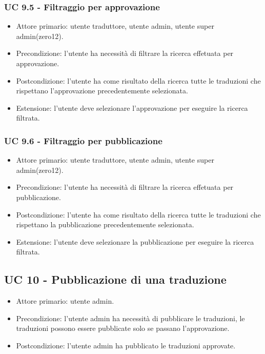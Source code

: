     \subsubsection{UC 9.5 - Filtraggio per approvazione}
        \begin{itemize}
            \item Attore primario: utente traduttore, utente admin, utente super admin(zero12).
            \item Precondizione: l'utente ha necessità di filtrare la ricerca effetuata per approvazione.
            \item Postcondizione: l'utente ha come risultato della ricerca tutte le traduzioni che rispettano l'approvazione precedentemente selezionata. 
            \item Estensione: l'utente deve selezionare l'approvazione per eseguire la ricerca filtrata.
        \end{itemize}  
    \subsubsection{UC 9.6 - Filtraggio per pubblicazione}
        \begin{itemize}
            \item Attore primario: utente traduttore, utente admin, utente super admin(zero12).
            \item Precondizione: l'utente ha necessità di filtrare la ricerca effetuata per pubblicazione.
            \item Postcondizione: l'utente ha come risultato della ricerca tutte le traduzioni che rispettano la pubblicazione precedentemente selezionata. 
            \item Estensione: l'utente deve selezionare la pubblicazione per eseguire la ricerca filtrata.
        \end{itemize} 
\subsection{UC 10 - Pubblicazione di una traduzione}
        \begin{itemize}
            \item Attore primario: utente admin.
            \item Precondizione: l'utente admin ha necessità di pubblicare le traduzioni, le traduzioni possono essere pubblicate solo se passano l'approvazione. 
            \item Postcondizione: l'utente admin ha pubblicato le traduzioni approvate. 
        \end{itemize}
